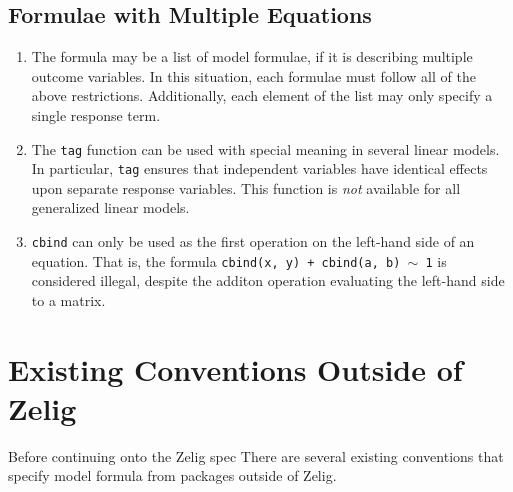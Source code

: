 \documentclass{article}
\newcommand{\tweedly}[0]{$\sim${ }}
\begin{document}
\subsection{Formulae with Multiple Equations}
\label{subsec:multiple}

\begin{enumerate}

  \item The formula may be a list of model formulae, if it is describing
    multiple outcome variables. In this situation, each formulae must follow
    all of the above restrictions. Additionally, each element of the list may
    only specify a single response term.

  \item The {\tt tag} function can be used with special meaning in several
    linear models. In particular, {\tt tag} ensures that independent variables
    have identical effects upon separate response variables. This function is
    \emph{not} available for all generalized linear models.

  \item \verb|cbind| can only be used as the first operation on the left-hand side
    of an equation. That is, the formula
    {\tt cbind(x, y) + cbind(a, b) \tweedly 1} is considered illegal, despite
    the additon operation evaluating the left-hand side to a matrix.

\end{enumerate}



%
%
%
\section{Existing Conventions Outside of Zelig}
\label{sec:existing-elsewhere}

Before continuing onto the Zelig spec
There are several existing conventions that specify model formula from packages
outside of Zelig.
\end{document}
